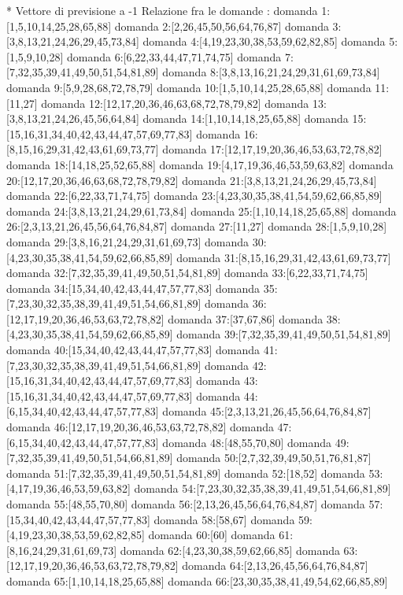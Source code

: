 * Vettore di previsione a -1
Relazione fra le domande :
domanda 1:[1,5,10,14,25,28,65,88]
domanda 2:[2,26,45,50,56,64,76,87]
domanda 3:[3,8,13,21,24,26,29,45,73,84]
domanda 4:[4,19,23,30,38,53,59,62,82,85]
domanda 5:[1,5,9,10,28]
domanda 6:[6,22,33,44,47,71,74,75]
domanda 7:[7,32,35,39,41,49,50,51,54,81,89]
domanda 8:[3,8,13,16,21,24,29,31,61,69,73,84]
domanda 9:[5,9,28,68,72,78,79]
domanda 10:[1,5,10,14,25,28,65,88]
domanda 11:[11,27]
domanda 12:[12,17,20,36,46,63,68,72,78,79,82]
domanda 13:[3,8,13,21,24,26,45,56,64,84]
domanda 14:[1,10,14,18,25,65,88]
domanda 15:[15,16,31,34,40,42,43,44,47,57,69,77,83]
domanda 16:[8,15,16,29,31,42,43,61,69,73,77]
domanda 17:[12,17,19,20,36,46,53,63,72,78,82]
domanda 18:[14,18,25,52,65,88]
domanda 19:[4,17,19,36,46,53,59,63,82]
domanda 20:[12,17,20,36,46,63,68,72,78,79,82]
domanda 21:[3,8,13,21,24,26,29,45,73,84]
domanda 22:[6,22,33,71,74,75]
domanda 23:[4,23,30,35,38,41,54,59,62,66,85,89]
domanda 24:[3,8,13,21,24,29,61,73,84]
domanda 25:[1,10,14,18,25,65,88]
domanda 26:[2,3,13,21,26,45,56,64,76,84,87]
domanda 27:[11,27]
domanda 28:[1,5,9,10,28]
domanda 29:[3,8,16,21,24,29,31,61,69,73]
domanda 30:[4,23,30,35,38,41,54,59,62,66,85,89]
domanda 31:[8,15,16,29,31,42,43,61,69,73,77]
domanda 32:[7,32,35,39,41,49,50,51,54,81,89]
domanda 33:[6,22,33,71,74,75]
domanda 34:[15,34,40,42,43,44,47,57,77,83]
domanda 35:[7,23,30,32,35,38,39,41,49,51,54,66,81,89]
domanda 36:[12,17,19,20,36,46,53,63,72,78,82]
domanda 37:[37,67,86]
domanda 38:[4,23,30,35,38,41,54,59,62,66,85,89]
domanda 39:[7,32,35,39,41,49,50,51,54,81,89]
domanda 40:[15,34,40,42,43,44,47,57,77,83]
domanda 41:[7,23,30,32,35,38,39,41,49,51,54,66,81,89]
domanda 42:[15,16,31,34,40,42,43,44,47,57,69,77,83]
domanda 43:[15,16,31,34,40,42,43,44,47,57,69,77,83]
domanda 44:[6,15,34,40,42,43,44,47,57,77,83]
domanda 45:[2,3,13,21,26,45,56,64,76,84,87]
domanda 46:[12,17,19,20,36,46,53,63,72,78,82]
domanda 47:[6,15,34,40,42,43,44,47,57,77,83]
domanda 48:[48,55,70,80]
domanda 49:[7,32,35,39,41,49,50,51,54,66,81,89]
domanda 50:[2,7,32,39,49,50,51,76,81,87]
domanda 51:[7,32,35,39,41,49,50,51,54,81,89]
domanda 52:[18,52]
domanda 53:[4,17,19,36,46,53,59,63,82]
domanda 54:[7,23,30,32,35,38,39,41,49,51,54,66,81,89]
domanda 55:[48,55,70,80]
domanda 56:[2,13,26,45,56,64,76,84,87]
domanda 57:[15,34,40,42,43,44,47,57,77,83]
domanda 58:[58,67]
domanda 59:[4,19,23,30,38,53,59,62,82,85]
domanda 60:[60]
domanda 61:[8,16,24,29,31,61,69,73]
domanda 62:[4,23,30,38,59,62,66,85]
domanda 63:[12,17,19,20,36,46,53,63,72,78,79,82]
domanda 64:[2,13,26,45,56,64,76,84,87]
domanda 65:[1,10,14,18,25,65,88]
domanda 66:[23,30,35,38,41,49,54,62,66,85,89]
